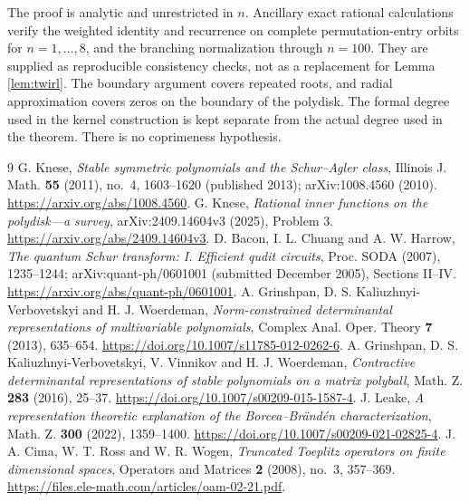 \documentclass[11pt,a4paper]{article}
\theoremstyle{remark}\newtheorem{remark}[theorem]{Remark}
\begin{document}
The proof is analytic and unrestricted in $n$. Ancillary exact rational calculations verify the weighted identity and recurrence on complete permutation-entry orbits for $n=1,\ldots,8$, and the branching normalization through $n=100$. They are supplied as reproducible consistency checks, not as a replacement for Lemma \ref{lem:twirl}. The boundary argument covers repeated roots, and radial approximation covers zeros on the boundary of the polydisk. The formal degree used in the kernel construction is kept separate from the actual degree used in the theorem. There is no coprimeness hypothesis.

\begin{thebibliography}{9}
 G. Knese, \emph{Stable symmetric polynomials and the Schur--Agler class}, Illinois J. Math. \textbf{55} (2011), no.~4, 1603--1620 (published 2013); arXiv:1008.4560 (2010). \url{https://arxiv.org/abs/1008.4560}.
 G. Knese, \emph{Rational inner functions on the polydisk---a survey}, arXiv:2409.14604v3 (2025), Problem 3. \url{https://arxiv.org/abs/2409.14604v3}.
 D. Bacon, I. L. Chuang and A. W. Harrow, \emph{The quantum Schur transform: I. Efficient qudit circuits}, Proc. SODA (2007), 1235--1244; arXiv:quant-ph/0601001 (submitted December 2005), Sections II--IV. \url{https://arxiv.org/abs/quant-ph/0601001}.
 A. Grinshpan, D. S. Kaliuzhnyi-Verbovetskyi and H. J. Woerdeman, \emph{Norm-constrained determinantal representations of multivariable polynomials}, Complex Anal. Oper. Theory \textbf{7} (2013), 635--654. \url{https://doi.org/10.1007/s11785-012-0262-6}.
 A. Grinshpan, D. S. Kaliuzhnyi-Verbovetskyi, V. Vinnikov and H. J. Woerdeman, \emph{Contractive determinantal representations of stable polynomials on a matrix polyball}, Math. Z. \textbf{283} (2016), 25--37. \url{https://doi.org/10.1007/s00209-015-1587-4}.
 J. Leake, \emph{A representation theoretic explanation of the Borcea--Br\"and\'en characterization}, Math. Z. \textbf{300} (2022), 1359--1400. \url{https://doi.org/10.1007/s00209-021-02825-4}.
 J. A. Cima, W. T. Ross and W. R. Wogen, \emph{Truncated Toeplitz operators on finite dimensional spaces}, Operators and Matrices \textbf{2} (2008), no.~3, 357--369. \url{https://files.ele-math.com/articles/oam-02-21.pdf}.
\end{thebibliography}
\end{document}
